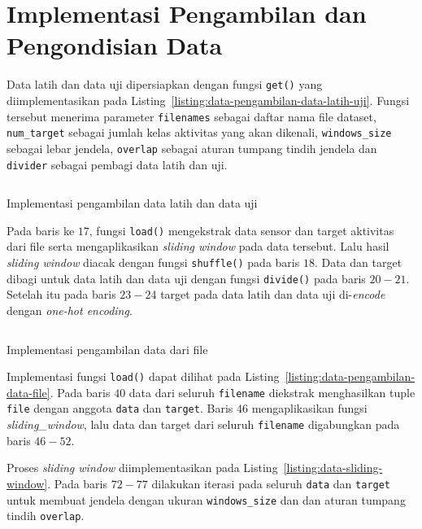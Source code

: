 \section{Implementasi Pengambilan dan Pengondisian Data}
Data latih dan data uji dipersiapkan dengan fungsi \texttt{get()} yang diimplementasikan pada Listing~\ref{listing:data-pengambilan-data-latih-uji}. Fungsi tersebut menerima parameter \texttt{filenames} sebagai daftar nama file dataset, \texttt{num_target} sebagai jumlah kelas aktivitas yang akan dikenali, \texttt{windows_size} sebagai lebar jendela, \texttt{overlap} sebagai aturan tumpang tindih jendela dan \texttt{divider} sebagai pembagi data latih dan uji.

\begin{listing}[h]
    \inputminted[firstline=5,firstnumber=5,lastline=26]{python}{../har/data.py}
    \caption{Implementasi pengambilan data latih dan data uji}
    \label{listing:data-pengambilan-data-latih-uji}
\end{listing}

Pada baris ke $17$, fungsi \texttt{load()} mengekstrak data sensor dan target aktivitas dari file serta mengaplikasikan \textit{sliding window} pada data tersebut. Lalu hasil \textit{sliding window} diacak dengan fungsi \texttt{shuffle()} pada baris $18$. Data dan target dibagi untuk data latih dan data uji dengan fungsi \texttt{divide()} pada baris $20 - 21$. Setelah itu pada baris $23 - 24$ target pada data latih dan data uji di-\textit{encode} dengan \textit{one-hot encoding}.

\begin{listing}[h]
    \inputminted[firstline=29,firstnumber=29,lastline=57]{python}{../har/data.py}
    \caption{Implementasi pengambilan data dari file}
    \label{listing:data-pengambilan-data-file}
\end{listing}

Implementasi fungsi \texttt{load()} dapat dilihat pada Listing~\ref{listing:data-pengambilan-data-file}. Pada baris $40$ data dari seluruh \texttt{filename} diekstrak menghasilkan tuple \texttt{file} dengan anggota \texttt{data} dan \texttt{target}. Baris $46$ mengaplikasikan fungsi \textit{sliding\_window}, lalu data dan target dari seluruh \texttt{filename} digabungkan pada baris $46-52$.

Proses \textit{sliding window} diimplementasikan pada Listing~\ref{listing:data-sliding-window}. Pada baris $72-77$ dilakukan iterasi pada seluruh \texttt{data} dan \texttt{target} untuk membuat jendela dengan ukuran \texttt{windows_size} dan dan aturan tumpang tindih \texttt{overlap}.

